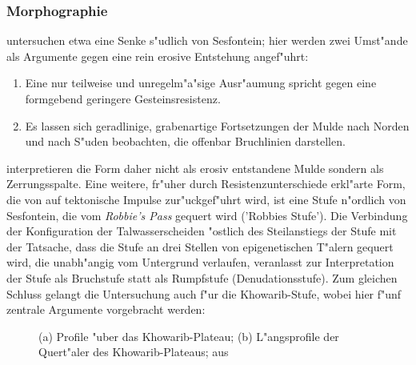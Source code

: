 \documentclass[titlepage,a4paper]{scrartcl}
\begin{document}
\subsubsection{Morphographie}

\cite{BrunotteAndSpoenemann1997} untersuchen etwa eine Senke s"udlich von Sesfontein; hier werden zwei Umst"ande als Argumente gegen eine rein erosive Entstehung angef"uhrt: 

\begin{enumerate}
\item Eine nur teilweise und unregelm"a"sige Ausr"aumung spricht gegen eine formgebend geringere Gesteinsresistenz.
\item Es lassen sich geradlinige, grabenartige Fortsetzungen der Mulde nach Norden und nach S"uden beobachten, die offenbar Bruchlinien darstellen.
\end{enumerate}

\cite{BrunotteAndSpoenemann1997} interpretieren die Form daher nicht als erosiv entstandene Mulde sondern als Zerrungsspalte. Eine weitere, fr"uher durch Resistenzunterschiede erkl"arte Form, die von \cite{BrunotteAndSpoenemann1997} auf tektonische Impulse zur"uckgef"uhrt wird, ist eine Stufe n"ordlich von Sesfontein, die vom \emph{Robbie's Pass} gequert wird ('Robbies Stufe'). Die Verbindung der Konfiguration der Talwasserscheiden "ostlich des Steilanstiegs der Stufe mit der Tatsache, dass die Stufe an drei Stellen von epigenetischen T"alern gequert wird, die unabh"angig vom Untergrund verlaufen, veranlasst \cite{BrunotteAndSpoenemann1997} zur Interpretation der Stufe als Bruchstufe statt als Rumpfstufe (Denudationsstufe). Zum gleichen Schluss gelangt die Untersuchung auch f"ur die Khowarib-Stufe, wobei hier f"unf zentrale Argumente vorgebracht werden:

\begin{figure}
\begin{center}
\end{center}
\caption[Profile "uber das Khowarib-Plateau]{(a) Profile "uber das Khowarib-Plateau; (b) L"angsprofile der Quert"aler des Khowarib-Plateaus; aus \cite{BrunotteAndSpoenemann1997}}
\label{profile}
\end{figure}
\end{document}
